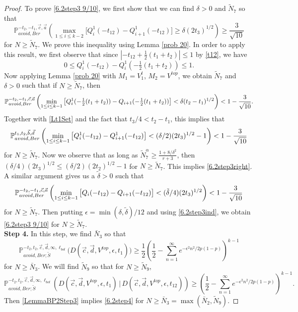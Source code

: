 \begin{proof}
	To prove \eqref{6.2step3 9/10}, we first show that we can find $\delta > 0$ and $\tilde{N}_7$ so that
	\begin{equation}\label{6.2step3right}
	\mathbb{P}^{-t_2,-t_1,\vec{c},\vec{a}}_{avoid, Ber}\left(\max_{1\leq i\leq k-2} \big[Q^1_i(-t_{12}) - Q^1_{i+1}(-t_{12})\big] \geq \delta(2t_3)^{1/2}\right) \geq \frac{3}{\sqrt{10}}
	\end{equation}
	for $N\geq\tilde{N}_7$. We prove this inequality using Lemma \ref{prob 20}. In order to apply this result, we first observe that since $|-t_{12}+\frac{1}{2}(t_1+t_2)| \leq 1$ by \eqref{t12}, we have
	\begin{equation}\label{Lt1Set}
	0 \leq Q^1_i(-t_{12})-Q^1_i(-\tfrac{1}{2}(t_1+t_2)) \leq 1.
	\end{equation}
	Now applying Lemma \ref{prob 20} with $M_1 = V_1^t$, $M_2 = V^{top}$, we obtain $\tilde{N}_7$ and $\delta>0$ such that if $N \geq \tilde{N}_7$, then
	\[
	\mathbb{P}^{-t_2,-t_1,\vec c, \vec a}_{avoid,Ber}\left(\min_{1\leq i\leq k-1} \big[Q^1_i(-\tfrac{1}{2}(t_1+t_2))-Q_{i+1}(-\tfrac{1}{2}(t_1+t_2))\big] < \delta(t_2-t_1)^{1/2}\right) < 1 - \frac{3}{\sqrt{10}}.
	\]
	Together with \eqref{Lt1Set} and the fact that $t_3/4 < t_2-t_1$, this implies that
	\begin{equation}\label{step3delta/2}
	\mathbb{P}^{t_1,t_2,\vec b, \vec d}_{avoid,Ber}\left(\min_{1\leq i\leq k-1} \big[Q_i^1(-t_{12})-Q_{i+1}^1(-t_{12})\big]<(\delta/2)(2t_3)^{1/2}-1\right) < 1 - \frac{3}{\sqrt{10}}
	\end{equation}
	for $N\geq \tilde{N}_7$. Now we observe that as long as $\tilde{N}_7^\alpha \geq \frac{1+8/\delta^2}{r+3}$, then $(\delta/4)(2t_3)^{1/2} \leq (\delta/2)(2t_2)^{1/2} - 1$ for $N\geq\tilde{N}_7$. This implies \eqref{6.2step3right}. A similar argument gives us a $\tilde{\delta}>0$ such that
	\[
	\mathbb{P}^{-t_2,-t_1,\vec c, \vec a}_{avoid,Ber}\left(\min_{1\leq i\leq k-1} \big[Q_i(-t_{12})-Q_{i+1}(-t_{12})\big]<(\tilde\delta/4)(2t_3)^{1/2}\right)<1 - \frac{3}{\sqrt{10}}
	\]
	for $N\geq\tilde{N}_7$. Then putting $\epsilon = \min(\delta,\tilde{\delta})/12$ and using \eqref{6.2step3ind}, we obtain \eqref{6.2step3 9/10} for $N\geq\tilde{N}_7$.\\
	
	{\bf \raggedleft Step 4.} In this step, we find $\bar{N}_3$ so that
	\begin{equation}\label{6.2step4}
	\mathbb{P}^{-t_2,t_2,\vec{c},\vec{d},\infty,\ell_{bot}}_{avoid,Ber;\tilde S}\big(D(\vec{c},\vec{d},V^{top},\epsilon,t_1) \big) \geq \frac{1}{2}\left(\frac{1}{2} - \sum_{n=1}^\infty e^{-\epsilon^2 n^2/2p(1-p)}\right)^{k-1}
	\end{equation}
	for $N\geq\bar{N}_3$. We will find $\tilde{N}_9$ so that for $N\geq\tilde{N}_9$,
	\begin{equation}\label{6.2step4sep}
	\mathbb{P}^{-t_2,t_2,\vec{c},\vec{d},\infty,\ell_{bot}}_{avoid,Ber;\tilde S}\left(D(\vec{c},\vec{d},V^{top},\epsilon,t_1) \,\big|\,D(\vec c, \vec d, V^{top}, \epsilon,t_{12})\right) \geq \left(\frac{1}{2} - \sum_{n=1}^\infty e^{-\epsilon^2 n^2/2p(1-p)}\right)^{k-1}.
	\end{equation}
	Then \eqref{LemmaBP2Step3} implies \eqref{6.2step4} for $N\geq\bar{N}_3 = \max(\bar{N}_2,\tilde{N}_9)$.
	

\end{proof}
